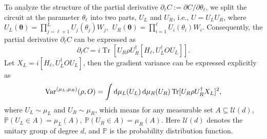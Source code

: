 \documentclass[%
 superscriptaddress,
 aps,prl,
 reprint,
 twocolumn,
 amsmath,amssymb,showpacs,
 bibnotes,
]{revtex4-2}
\newcommand*{\dif}{\mathop{}\!\mathrm{d}}
\begin{document}



To analyze the structure of the partial derivative $\partial_\ell C:=\partial C/\partial\theta_\ell$, we split the circuit at the parameter $\theta_\ell$ into two parts, $U_L$ and $U_R$, i.e., $U = U_L U_R$, where $U_L(\boldsymbol\theta) = \prod_{j=\ell+1}^L U_j(\theta_j) W_j$, $\ U_R(\boldsymbol\theta) = \prod_{i=1}^\ell U_i(\theta_i) W_i$. Consequently, the partial derivative $\partial_\ell C$ can be expressed as
\begin{equation}
    \partial_\ell C = i\operatorname{Tr}[U_R\rho U_R^\dagger [H_\ell, U_L^\dagger O U_L]].
    \label{eq: var}
\end{equation}
Let $X_L = i[H_\ell, U_L^\dagger O U_L]$, then the gradient variance can be expressed explicitly as 
\begin{equation}
    {\rm Var}^{(\mu_L,\mu_R)}(\rho, O) =\int\dif\mu_L(U_L)\dif\mu_R(U_R)\operatorname{Tr}[U_R\rho U_R^\dagger X_L]^2,
    \label{eq:var2}
\end{equation}
where $U_L\sim \mu_L$ and $U_R\sim \mu_R$, which means for any measurable set $A\subseteq \mathcal{U}(d)$, $\mathbb{P}(U_L\in A) = \mu_L(A),\ \mathbb{P}(U_R\in A) = \mu_R(A)$. Here $\mathcal{U}(d)$ denotes the unitary group of degree $d$, and $\mathbb{P}$ is the probability distribution function.
\end{document}
